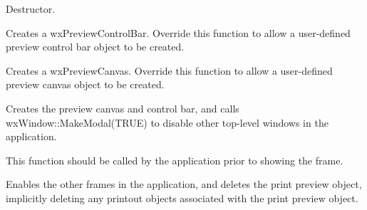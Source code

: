
Destructor. 



Creates a wxPreviewControlBar. Override this function to allow
a user-defined preview control bar object to be created.



Creates a wxPreviewCanvas. Override this function to allow
a user-defined preview canvas object to be created.



Creates the preview canvas and control bar, and calls
wxWindow::MakeModal(TRUE) to disable other top-level windows
in the application.

This function should be called by the application prior to
showing the frame.



Enables the other frames in the application, and deletes the print preview
object, implicitly deleting any printout objects associated with the print
preview object.

